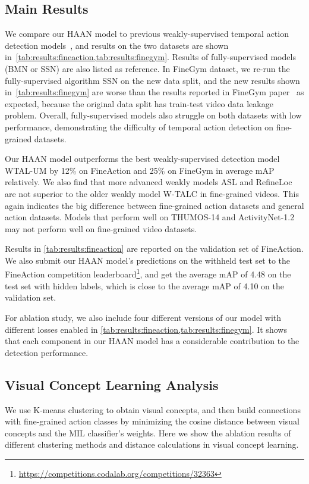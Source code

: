 \subsection{Main Results}
We compare our HAAN model to previous weakly-supervised temporal action detection models~\cite{paul2018w,pardo2021refineloc,ma2021weakly,lee2021weakly,narayan2021d2}, and results on the two datasets are shown in~\cref{tab:results:fineaction,tab:results:finegym}. Results of fully-supervised models (BMN or SSN) are also listed as reference. In FineGym dataset, we re-run the fully-supervised algorithm SSN \cite{zhao2017temporal} on the new data split, and the new results shown in~\cref{tab:results:finegym} are worse than the results reported in FineGym paper~\cite{shao2020finegym} as expected, because the original data split has train-test video data leakage problem.
Overall, fully-supervised models also struggle on both datasets with low performance, demonstrating the difficulty of temporal action detection on fine-grained datasets.




Our HAAN model outperforms the best weakly-supervised detection model WTAL-UM \cite{lee2021weakly} by 12\% on FineAction and 25\% on FineGym in average mAP relatively. We also find that more advanced weakly models ASL \cite{ma2021weakly} and RefineLoc \cite{pardo2021refineloc} are not superior to the older weakly model W-TALC \cite{paul2018w} in fine-grained videos. This again indicates the big difference between fine-grained action datasets and general action datasets. Models that perform well on THUMOS-14 and ActivityNet-1.2 may not perform well on fine-grained video datasets.

Results in \cref{tab:results:fineaction} are reported on the validation set of FineAction. We also submit our HAAN model's predictions on the withheld test set to the FineAction competition leaderboard\footnote{\url{https://competitions.codalab.org/competitions/32363}}, and get the average mAP of 4.48 on the test set with hidden labels, which is close to the average mAP of 4.10 on the validation set.


For ablation study, we also include four different versions of our model with different losses enabled in \cref{tab:results:fineaction,tab:results:finegym}. It shows that each component in our HAAN model has a considerable contribution to the detection performance.


\subsection{Visual Concept Learning Analysis}
\label{sec:vc-learning}
We use K-means clustering to obtain visual concepts, and then build connections with fine-grained action classes by minimizing the cosine distance between visual concepts and the MIL classifier's weights. Here we show the ablation results of different clustering methods and distance calculations in visual concept learning. 


